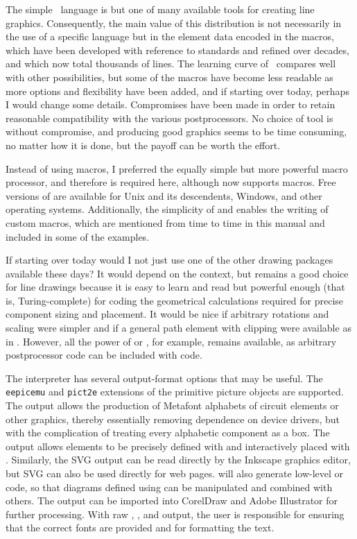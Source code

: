 The simple \pic\ language is but one of many available tools for creating
line graphics.  Consequently, the main value of this distribution is
not necessarily in the use of a specific language but in the element
data encoded in the macros, which have been developed with reference
to standards and refined over decades, and which now total thousands
of lines.  The learning curve of \pic\ compares well with other
possibilities, but some of the macros have become less readable as more
options and flexibility have been added, and if starting over today,
perhaps I would change some details. Compromises have been made in order
to retain reasonable compatibility with the various postprocessors.
No choice of tool is without compromise, and producing good graphics
seems to be time consuming, no matter how it is done, but the payoff
can be worth the effort.

Instead of using \pic macros, I preferred the equally simple but more
powerful \Mfour macro processor, and therefore \Mfour is required here,
although \dpic  now supports \pic macros.  Free versions of \Mfour
are available for Unix and its descendents, Windows, and other operating
systems.  Additionally, the simplicity of \Mfour and \pic enables the
writing of custom macros, which are mentioned from time to time in this
manual and included in some of the examples.

If starting over today would I not just use one of the other drawing
packages available these days?  It would depend on the context, but
\pic remains a good choice for line drawings because it is easy to learn
and read but powerful enough (that is, Turing-complete) for coding the
geometrical calculations required for precise component sizing and
placement. It would be nice if arbitrary rotations and scaling were
simpler and if a general path element with clipping were available
as in \Postscript.  However, all the power of \Postscript or \TPGF,
for example, remains available, as arbitrary postprocessor code can be
included with \pic code.

The \dpic interpreter has several output-format options that may be
useful.  The {\tt eepicemu} and {\tt pict2e} extensions of the
primitive \latex picture objects are supported.  The \mfpic output
allows the production of Metafont alphabets of circuit elements or
other graphics, thereby essentially removing dependence on device
drivers, but with the complication of treating every alphabetic
component as a \tex box.  The \xfig output allows elements to be
precisely defined with \dpic  and interactively placed with \xfig.
Similarly, the SVG output can be read directly by the Inkscape graphics
editor, but SVG can also be used directly for web pages.
\Dpic will also generate low-level \MetaPost or \Postscript code, so
that diagrams defined using \pic can be manipulated and combined with
others.  The \Postscript output can be imported into
CorelDraw
and Adobe Illustrator
for further processing.
With raw \Postscript, \PDF, and \SVG output, the user is
responsible for ensuring that the correct fonts are provided and for
formatting the text.

